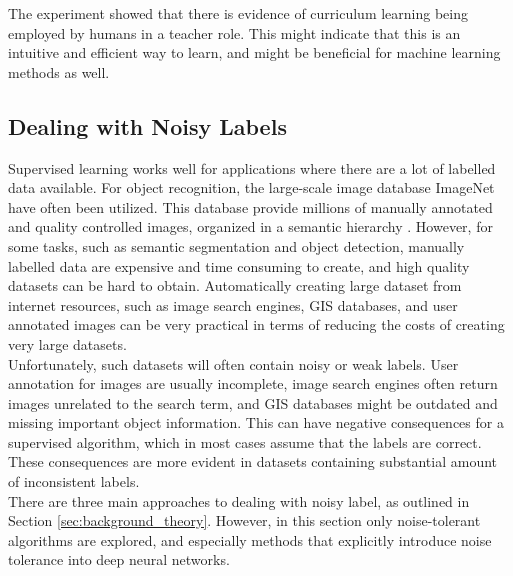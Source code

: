 The experiment showed that there is evidence of curriculum learning being employed by humans in a teacher role. This might indicate that this is an intuitive and efficient way to learn, and might be beneficial for machine learning methods as well. \\


\subsection{Dealing with Noisy Labels}
Supervised learning works well for applications where there are a lot of labelled data available. For object recognition, the large-scale image database ImageNet have often been utilized. This database provide millions of manually annotated and quality controlled images, organized in a semantic hierarchy \citep{Deng_imagenet}. However, for some tasks, such as semantic segmentation and object detection, manually labelled data are expensive and time consuming to create, and high quality datasets can be hard to obtain. Automatically creating large dataset from internet resources, such as image search engines, \ac{GIS} databases, and user annotated images can be very practical in terms of reducing the costs of creating very large datasets. \\

Unfortunately, such datasets will often contain noisy or weak labels. User annotation for images are usually incomplete, image search engines often return images unrelated to the search term, and \ac{GIS} databases might be outdated and missing important object information. This can have negative consequences for a supervised algorithm, which in most cases assume that the labels are correct. These consequences are more evident in datasets containing substantial amount of inconsistent labels.\\
 
There are three main approaches to dealing with noisy label, as outlined in Section \ref{sec:background_theory}. However, in this section only noise-tolerant algorithms are explored, and especially methods that explicitly introduce noise tolerance into deep neural networks.  


